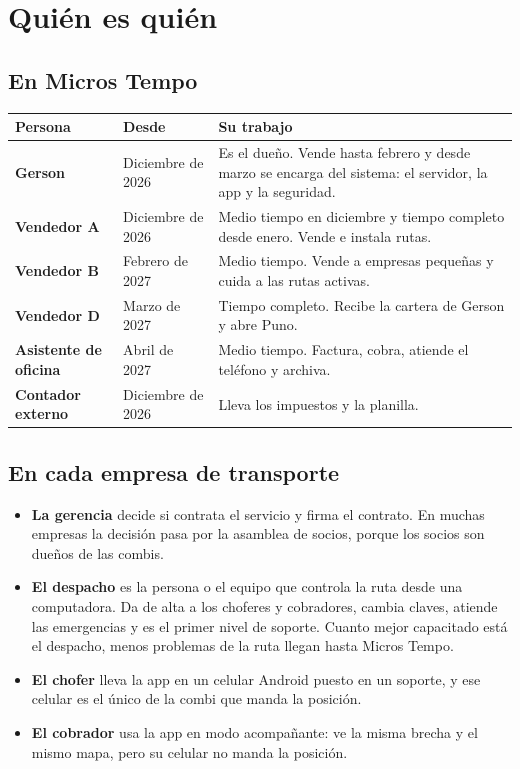 \documentclass[a4paper]{article}
\begin{document}
\section{Quién es quién}

\subsection{En Micros Tempo}

\begin{center}
\begin{tabularx}{\linewidth}{@{}>{\bfseries}p{3.6cm}p{3.4cm}X@{}}
\toprule
\normalfont Persona & Desde & Su trabajo\\
\midrule
Gerson & Diciembre de 2026 & Es el dueño. Vende hasta febrero y desde marzo se encarga del sistema: el servidor, la app y la seguridad.\\
Vendedor A & Diciembre de 2026 & Medio tiempo en diciembre y tiempo completo desde enero. Vende e instala rutas.\\
Vendedor B & Febrero de 2027 & Medio tiempo. Vende a empresas pequeñas y cuida a las rutas activas.\\
Vendedor D & Marzo de 2027 & Tiempo completo. Recibe la cartera de Gerson y abre Puno.\\
Asistente de oficina & Abril de 2027 & Medio tiempo. Factura, cobra, atiende el teléfono y archiva.\\
Contador externo & Diciembre de 2026 & Lleva los impuestos y la planilla.\\
\bottomrule
\end{tabularx}
\end{center}

\subsection{En cada empresa de transporte}

\begin{itemize}
\item \textbf{La gerencia} decide si contrata el servicio y firma el contrato. En muchas empresas la decisión pasa por la asamblea de socios, porque los socios son dueños de las combis.
\item \textbf{El despacho} es la persona o el equipo que controla la ruta desde una computadora. Da de alta a los choferes y cobradores, cambia claves, atiende las emergencias y es el primer nivel de soporte. Cuanto mejor capacitado está el despacho, menos problemas de la ruta llegan hasta Micros Tempo.
\item \textbf{El chofer} lleva la app en un celular Android puesto en un soporte, y ese celular es el único de la combi que manda la posición.
\item \textbf{El cobrador} usa la app en modo acompañante: ve la misma brecha y el mismo mapa, pero su celular no manda la posición.
\end{itemize}
\end{document}
